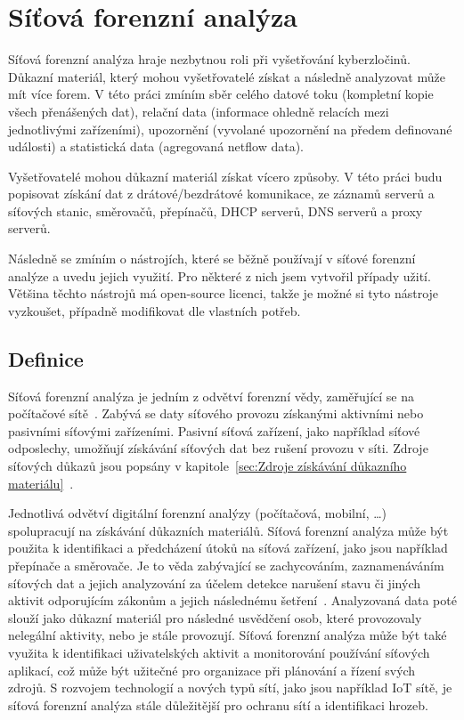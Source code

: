     

    

    

    
\chapter{Síťová forenzní analýza}
    Síťová forenzní analýza hraje nezbytnou roli při vyšetřování kyberzločinů. Důkazní materiál, který mohou vyšetřovatelé získat a následně analyzovat může mít více forem. V této práci zmíním sběr celého datové toku (kompletní kopie všech přenášených dat), relační data (informace ohledně relacích mezi jednotlivými zařízeními), upozornění (vyvolané upozornění na předem definované události) a statistická data (agregovaná netflow data).

    Vyšetřovatelé mohou důkazní materiál získat vícero způsoby. V této práci budu popisovat získání dat z drátové/bezdrátové komunikace, ze záznamů serverů a síťových stanic, směrovačů, přepínačů, \gls{DHCP} serverů, \gls{DNS} serverů a proxy serverů.

    Následně se zmíním o nástrojích, které se běžně používají v síťové forenzní analýze a uvedu jejich využití. Pro některé z nich jsem vytvořil případy užití. Většina těchto nástrojů má open-source licenci, takže je možné si tyto nástroje vyzkoušet, případně modifikovat dle vlastních potřeb.
    
\section{Definice}
    Síťová forenzní analýza je jedním z odvětví forenzní vědy, zaměřující se na počítačové sítě~\cite{EnisaReference}. Zabývá se daty síťového provozu získanými aktivními nebo pasivními síťovými zařízeními. Pasivní síťová zařízení, jako například síťové odposlechy, umožňují získávání síťových dat bez rušení provozu v síti. Zdroje síťových důkazů jsou popsány v kapitole~\ref{sec:Zdroje získávání důkazního materiálu}~\cite{ZembjakovaReference}. 
    
    Jednotlivá odvětví digitální forenzní analýzy (počítačová, mobilní, …) spolupracují na získávání důkazních materiálů. Síťová forenzní analýza může být použita k identifikaci a předcházení útoků na síťová zařízení, jako jsou například přepínače a směrovače. Je to věda zabývající se zachycováním, zaznamenáváním síťových dat a jejich analyzování za účelem detekce narušení stavu či jiných aktivit odporujícím zákonům a jejich následnému šetření~\cite{HandsOnNetworkForensicsReference}. Analyzovaná data poté slouží jako důkazní materiál pro následné usvědčení osob, které provozovaly nelegální aktivity, nebo je stále provozují. Síťová forenzní analýza může být také využita k identifikaci uživatelských aktivit a monitorování používání síťových aplikací, což může být užitečné pro organizace při plánování a řízení svých zdrojů. S rozvojem technologií a nových typů sítí, jako jsou například IoT sítě, je síťová forenzní analýza stále důležitější pro ochranu sítí a identifikaci hrozeb.
    
